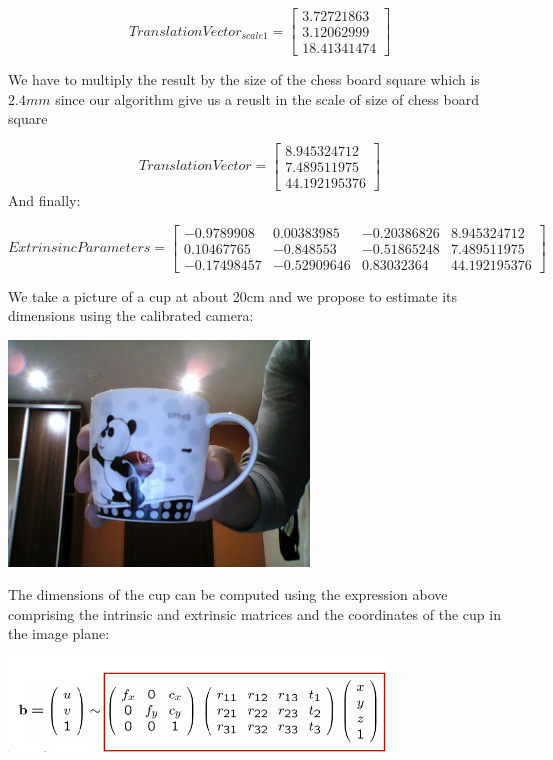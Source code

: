\documentclass[12pt,a4paper]{report}
\begin{document}
$$Translation Vector_{scale1}   =\left[\begin{array}{ccc} 3.72721863\\
       3.12062999\\
       18.41341474 \end{array}\right]$$

We have to multiply the result by the size of the chess board square which is $2.4mm$ since our algorithm give us a reuslt in the scale of size of chess board square

$$Translation Vector   =\left[\begin{array}{ccc}8.945324712\\
       7.489511975\\
       44.192195376 \end{array}\right]$$
And finally:

$$ExtrinsincParameters  =\left[\begin{array}{cccc} -0.9789908 &  0.00383985 & -0.20386826& 8.945324712\\
        0.10467765& -0.848553  & -0.51865248&7.489511975\\
       -0.17498457 &-0.52909646 & 0.83032364&44.192195376 \end{array}\right]$$

We take a picture of a cup at about 20cm and we propose to estimate its dimensions using the calibrated camera:

\begin{center}
\includegraphics[width=8cm]{Capture9.png}
\end{center}

The dimensions of the cup can be computed using the expression above comprising the intrinsic and extrinsic matrices and the coordinates of the cup in the image plane:

\begin{center}
\includegraphics[width=10cm]{Capture10.png}
\end{center}
\end{document}
